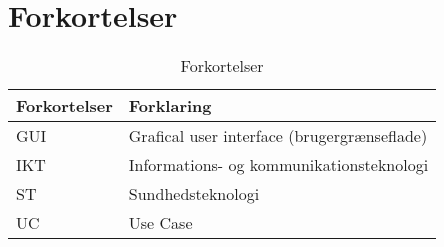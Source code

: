 \chapter{Forkortelser}
\begin{table}[h]
\centering
\begin{tabular}{|l| p{}|}
\hline
\textbf{Forkortelser} &  \textbf{Forklaring} \\\hline
GUI & Grafical user interface (brugergrænseflade) \\\hline
IKT & Informations- og kommunikationsteknologi \\\hline
ST  & Sundhedsteknologi \\\hline
UC  & Use Case \\\hline
\end{tabular}
\caption{Forkortelser}
\end{table}

\vspace{5cm}